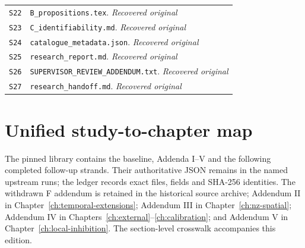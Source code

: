 \begin{longtable}{@{}>{\raggedright\arraybackslash}p{}>{\raggedright\arraybackslash}p{}@{}}
\hypertarget{S22}{}\label{source:S22}\texttt{S22} & \nolinkurl{B_propositions.tex}. \textit{Recovered original} \\
\hypertarget{S23}{}\label{source:S23}\texttt{S23} & \nolinkurl{C_identifiability.md}. \textit{Recovered original} \\
\hypertarget{S24}{}\label{source:S24}\texttt{S24} & \nolinkurl{catalogue_metadata.json}. \textit{Recovered original} \\
\hypertarget{S25}{}\label{source:S25}\texttt{S25} & \nolinkurl{research_report.md}. \textit{Recovered original} \\
\hypertarget{S26}{}\label{source:S26}\texttt{S26} & \nolinkurl{SUPERVISOR_REVIEW_ADDENDUM.txt}. \textit{Recovered original} \\
\hypertarget{S27}{}\label{source:S27}\texttt{S27} & \nolinkurl{research_handoff.md}. \textit{Recovered original} \\
\bottomrule
\end{longtable}


\section{Unified study-to-chapter map}

The pinned library contains the baseline, Addenda I--V and the following completed follow-up strands. Their authoritative JSON remains in the named upstream runs; the ledger records exact files, fields and SHA-256 identities. The withdrawn F addendum is retained in the historical source archive; Addendum II in Chapter~\ref{ch:temporal-extensions}; Addendum III in Chapter~\ref{ch:nz-spatial}; Addendum IV in Chapters~\ref{ch:external}--\ref{ch:calibration}; and Addendum V in Chapter~\ref{ch:local-inhibition}. The section-level crosswalk accompanies this edition.

